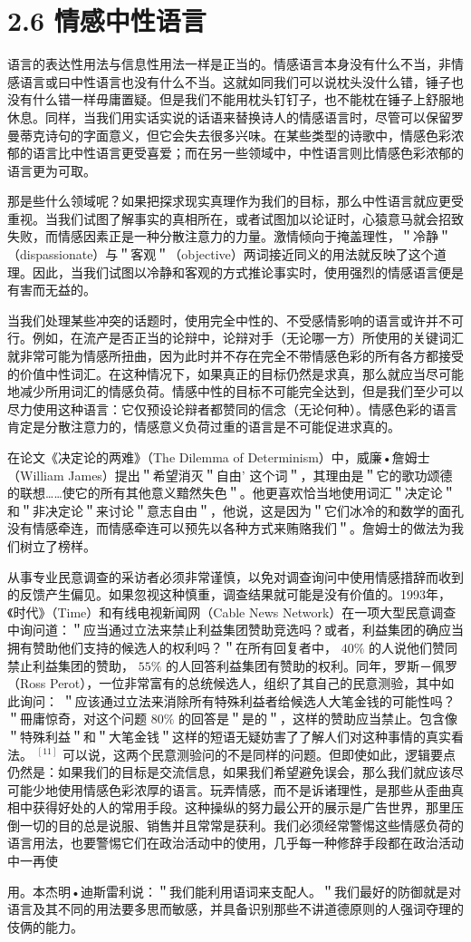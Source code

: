 \section*{2.6 情感中性语言}
语言的表达性用法与信息性用法一样是正当的。情感语言本身没有什么不当，非情感语言或曰中性语言也没有什么不当。这就如同我们可以说枕头没什么错，锤子也没有什么错一样毋庸置疑。但是我们不能用枕头钉钉子，也不能枕在锤子上舒服地休息。同样，当我们用实话实说的话语来替换诗人的情感语言时，尽管可以保留罗曼蒂克诗句的字面意义，但它会失去很多兴味。在某些类型的诗歌中，情感色彩浓郁的语言比中性语言更受喜爱；而在另一些领域中，中性语言则比情感色彩浓郁的语言更为可取。

那是些什么领域呢？如果把探求现实真理作为我们的目标，那么中性语言就应更受重视。当我们试图了解事实的真相所在，或者试图加以论证时，心猿意马就会招致失败，而情感因素正是一种分散注意力的力量。激情倾向于掩盖理性，＂冷静＂（dispassionate）与＂客观＂（objective）两词接近同义的用法就反映了这个道理。因此，当我们试图以冷静和客观的方式推论事实时，使用强烈的情感语言便是有害而无益的。

当我们处理某些冲突的话题时，使用完全中性的、不受感情影响的语言或许并不可行。例如，在流产是否正当的论辩中，论辩对手（无论哪一方）所使用的关键词汇就非常可能为情感所扭曲，因为此时并不存在完全不带情感色彩的所有各方都接受的价值中性词汇。在这种情况下，如果真正的目标仍然是求真，那么就应当尽可能地减少所用词汇的情感负荷。情感中性的目标不可能完全达到，但是我们至少可以尽力使用这种语言：它仅预设论辩者都赞同的信念（无论何种）。情感色彩的语言肯定是分散注意力的，情感意义负荷过重的语言是不可能促进求真的。

在论文《决定论的两难》（The Dilemma of Determinism）中，威廉•詹姆士（William James）提出＂希望消灭＂自由' 这个词＂，其理由是＂它的歌功颂德的联想……使它的所有其他意义黯然失色＂。他更喜欢恰当地使用词汇＂决定论＂和＂非决定论＂来讨论＂意志自由＂，他说，这是因为＂它们冰冷的和数学的面孔没有情感牵连，而情感牵连可以预先以各种方式来贿赂我们＂。詹姆士的做法为我们树立了榜样。

从事专业民意调查的采访者必须非常谨慎，以免对调查询问中使用情感措辞而收到的反馈产生偏见。如果忽视这种慎重，调查结果就可能是没有价值的。1993年，《时代》（Time）和有线电视新闻网（Cable News Network）在一项大型民意调查中询问道：＂应当通过立法来禁止利益集团赞助竞选吗？或者，利益集团的确应当拥有赞助他们支持的候选人的权利吗？＂在所有回复者中， $40 \%$ 的人说他们赞同禁止利益集团的赞助， $55 \%$ 的人回答利益集团有赞助的权利。同年，罗斯－佩罗（Ross Perot），一位非常富有的总统候选人，组织了其自己的民意测验，其中如此询问： ＂应该通过立法来消除所有特殊利益者给候选人大笔金钱的可能性吗？＂冊庸惊奇，对这个问题 $80 \%$ 的回答是＂是的＂，这样的赞助应当禁止。包含像＂特殊利益＂和＂大笔金钱＂这样的短语无疑妨害了了解人们对这种事情的真实看法。 ${ }^{[11]}$ 可以说，这两个民意测验问的不是同样的问题。但即使如此，逻辑要点仍然是：如果我们的目标是交流信息，如果我们希望避免误会，那么我们就应该尽可能少地使用情感色彩浓厚的语言。玩弄情感，而不是诉诸理性，是那些从歪曲真相中获得好处的人的常用手段。这种操纵的努力最公开的展示是广告世界，那里压倒一切的目的总是说服、销售并且常常是获利。我们必须经常警惕这些情感负荷的语言用法，也要警惕它们在政治活动中的使用，几乎每一种修辞手段都在政治活动中一再使

用。本杰明•迪斯雷利说：＂我们能利用语词来支配人。＂我们最好的防御就是对语言及其不同的用法要多思而敏感，并具备识别那些不讲道德原则的人强词夺理的伎俩的能力。 